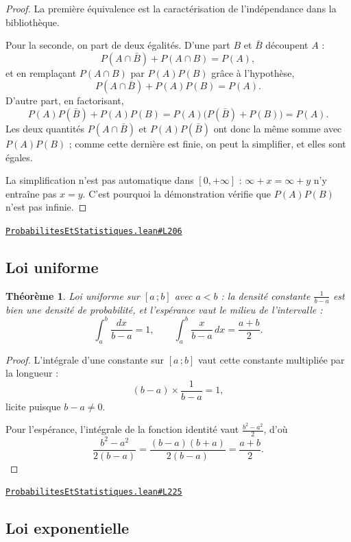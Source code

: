 \documentclass[11pt,a4paper]{article}
\theoremstyle{definition}
\theoremstyle{plain}
\newtheorem{theoreme}{Théorème}
\newcommand{\source}[2]{\par\smallskip\noindent\hfill{\footnotesize\href{#1}{\texttt{#2}}}\par\smallskip}
\begin{document}
\begin{proof}
La première équivalence est la caractérisation de l'indépendance dans la bibliothèque.

Pour la seconde, on part de deux égalités. D'une part $B$ et $\bar B$ découpent $A$ :
\[ P(A \cap \bar B) + P(A \cap B) = P(A) , \]
et en remplaçant $P(A \cap B)$ par $P(A)P(B)$ grâce à l'hypothèse,
\[ P(A \cap \bar B) + P(A)P(B) = P(A) . \]
D'autre part, en factorisant,
\[ P(A)P(\bar B) + P(A)P(B) = P(A)\bigl(P(\bar B) + P(B)\bigr) = P(A) . \]
Les deux quantités $P(A \cap \bar B)$ et $P(A)P(\bar B)$ ont donc la même somme avec
$P(A)P(B)$ ; comme cette dernière est finie, on peut la simplifier, et elles sont égales.

\medskip\noindent
La simplification n'est pas automatique dans $[0, +\infty]$ : $\infty + x = \infty + y$ n'y
entraîne pas $x = y$. C'est pourquoi la démonstration vérifie que $P(A)P(B)$ n'est pas
infinie.
\end{proof}
\source{https://github.com/Commutator-IO/learn-lean/blob/main/cours/02-lycee/09-probabilites-et-statistiques/ProbabilitesEtStatistiques.lean\#L206}{ProbabilitesEtStatistiques.lean\#L206}

\subsection{Loi uniforme}

\begin{theoreme}
Loi uniforme sur $[a\,;b]$ avec $a < b$ : la densité constante $\frac{1}{b-a}$ est bien
une densité de probabilité, et l'espérance vaut le milieu de l'intervalle :
\[ \int_a^b \frac{dx}{b-a} = 1 , \qquad
   \int_a^b \frac{x}{b-a}\,dx = \frac{a+b}{2} . \]
\end{theoreme}

\begin{proof}
L'intégrale d'une constante sur $[a\,;b]$ vaut cette constante multipliée par la longueur :
\[ (b - a) \times \frac{1}{b-a} = 1 , \]
licite puisque $b - a \ne 0$.

Pour l'espérance, l'intégrale de la fonction identité vaut $\frac{b^{2}-a^{2}}{2}$, d'où
\[ \frac{b^{2}-a^{2}}{2(b-a)} = \frac{(b-a)(b+a)}{2(b-a)} = \frac{a+b}{2} . \]
\end{proof}
\source{https://github.com/Commutator-IO/learn-lean/blob/main/cours/02-lycee/09-probabilites-et-statistiques/ProbabilitesEtStatistiques.lean\#L225}{ProbabilitesEtStatistiques.lean\#L225}

\subsection{Loi exponentielle}
\end{document}
